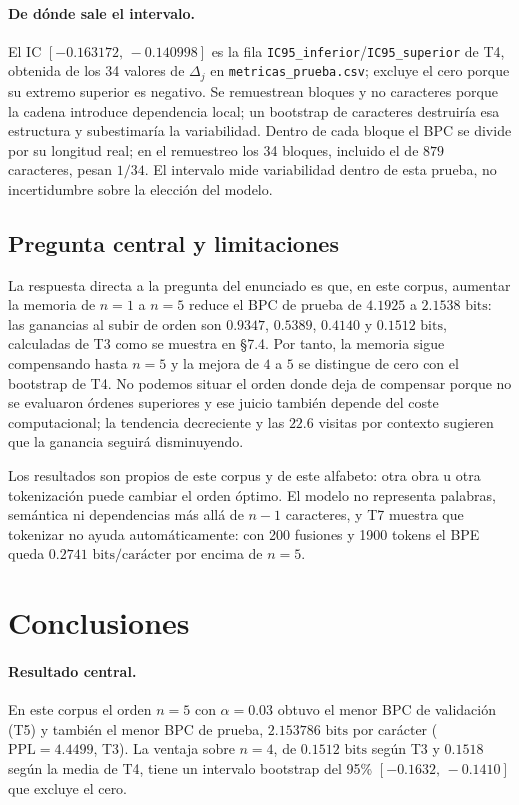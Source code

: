 \documentclass[11pt,letterpaper]{article}
\begin{document}
	\paragraph{De dónde sale el intervalo.}
	El IC $[-0.163172,\, -0.140998]$ es la fila \texttt{IC95\_inferior}/\texttt{IC95\_superior} de T4, obtenida de los 34 valores de $\Delta_j$ en \texttt{metricas\_prueba.csv}; excluye el cero porque su extremo superior es negativo. Se remuestrean bloques y no caracteres porque la cadena introduce dependencia local; un bootstrap de caracteres destruiría esa estructura y subestimaría la variabilidad. Dentro de cada bloque el BPC se divide por su longitud real; en el remuestreo los 34 bloques, incluido el de $879$ caracteres, pesan $1 / 34$. El intervalo mide variabilidad dentro de esta prueba, no incertidumbre sobre la elección del modelo.
	
	\subsection{Pregunta central y limitaciones}
	
	La respuesta directa a la pregunta del enunciado es que, en este corpus, aumentar la memoria de $n = 1$ a $n = 5$ reduce el BPC de prueba de $4.1925$ a $2.1538\text{ bits}$: las ganancias al subir de orden son $0.9347$, $0.5389$, $0.4140$ y $0.1512\text{ bits}$, calculadas de T3 como se muestra en \S 7.4. Por tanto, la memoria sigue compensando hasta $n = 5$ y la mejora de $4$ a $5$ se distingue de cero con el bootstrap de T4. No podemos situar el orden donde deja de compensar porque no se evaluaron órdenes superiores y ese juicio también depende del coste computacional; la tendencia decreciente y las $22.6$ visitas por contexto sugieren que la ganancia seguirá disminuyendo.
	
	Los resultados son propios de este corpus y de este alfabeto: otra obra u otra tokenización puede cambiar el orden óptimo. El modelo no representa palabras, semántica ni dependencias más allá de $n - 1$ caracteres, y T7 muestra que tokenizar no ayuda automáticamente: con 200 fusiones y 1900 tokens el BPE queda $0.2741\text{ bits/carácter}$ por encima de $n = 5$.

	\section{Conclusiones}
	\paragraph{Resultado central.}
	En este corpus el orden $n = 5$ con $\alpha = 0.03$ obtuvo el menor BPC de validación (T5) y también el menor BPC de prueba, $2.153786\text{ bits}$ por carácter ($\mathrm{PPL} = 4.4499$, T3). La ventaja sobre $n = 4$, de $0.1512\text{ bits}$ según T3 y $0.1518$ según la media de T4, tiene un intervalo bootstrap del 95\% $[-0.1632,\, -0.1410]$ que excluye el cero.
	
\end{document}
